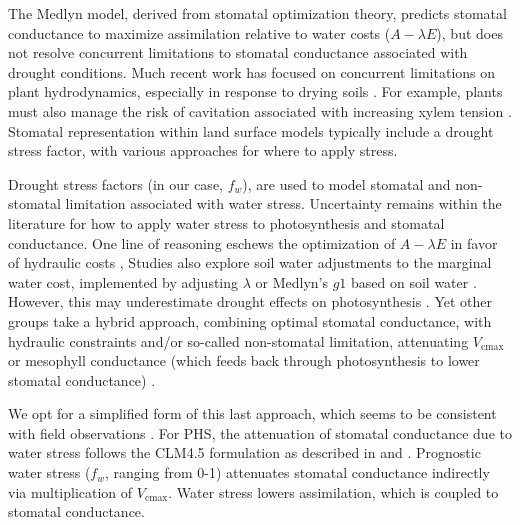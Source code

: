 \documentclass[draft,linenumbers]{agujournal}
\begin{document}
    The Medlyn model, derived from stomatal optimization theory, predicts stomatal conductance to maximize assimilation relative to water costs ($A-\lambda E$), 
    but does not resolve concurrent limitations to stomatal conductance associated with drought conditions.
    Much recent work has focused on concurrent limitations on plant hydrodynamics, especially in response to drying soils \citep{manzoni2013b,novick2016a,zhou2014}.
    For example, plants must also manage the risk of cavitation associated with increasing xylem tension \citep{sperry1998}.
    Stomatal representation within land surface models typically include a drought stress factor, with various approaches for where to apply stress.
    
    Drought stress factors (in our case, $f_w$), are used to model stomatal and non-stomatal limitation associated with water stress.
    Uncertainty remains within the literature for how to apply water stress to photosynthesis and stomatal conductance.
    One line of reasoning eschews the optimization of $A-\lambda E$ in favor of hydraulic costs \citep{sperry2017},
    Studies also explore soil water adjustments to the marginal water cost, implemented by adjusting $\lambda$ or Medlyn's $g1$ based on soil water \citep{manzoni2013b}.
    However, this may underestimate drought effects on photosynthesis \citep{zhou2013,lin2018}.
    Yet other groups take a hybrid approach, combining optimal stomatal conductance, with hydraulic constraints and/or
    so-called non-stomatal limitation, attenuating $V_{\text{cmax}}$ or mesophyll conductance
    (which feeds back through photosynthesis to lower stomatal conductance) \citep{egea2011,novick2016a}.
    
    We opt for a simplified form of this last approach, which seems to be consistent with field observations \citep{lin2018}.
    For PHS, the attenuation of stomatal conductance due to water stress follows the CLM4.5 formulation as described in \citet{oleson2013} and \citet{bonan2011}. 
    Prognostic water stress ($f_w$, ranging from 0-1) attenuates stomatal conductance indirectly via multiplication of $V_{\text{cmax}}$.
    Water stress lowers assimilation, which is coupled to stomatal conductance.
    
\end{document}
